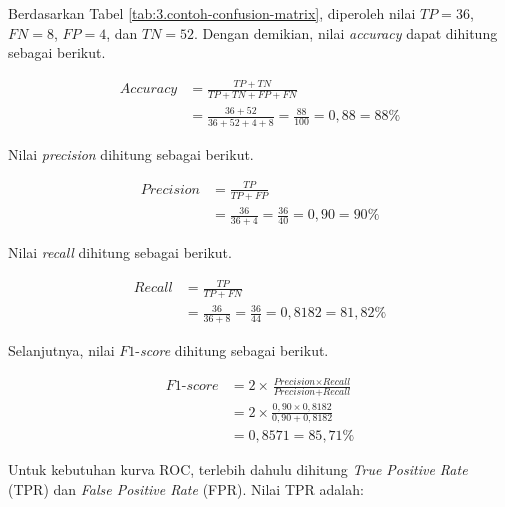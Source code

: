 Berdasarkan Tabel \ref{tab:3.contoh-confusion-matrix}, diperoleh nilai $TP = 36$, $FN = 8$, $FP = 4$, dan $TN = 52$. Dengan demikian, nilai \textit{accuracy} dapat dihitung sebagai berikut. \par

\begingroup
\setlength{\abovedisplayskip}{8pt}
\setlength{\belowdisplayskip}{10pt}
\setlength{\abovedisplayshortskip}{8pt}
\setlength{\belowdisplayshortskip}{10pt}
\setlength{\jot}{6pt}

\begin{align*}
\textit{Accuracy} &= \frac{TP + TN}{TP + TN + FP + FN} \\
&= \frac{36 + 52}{36 + 52 + 4 + 8} = \frac{88}{100} = 0{,}88 = 88\%
\end{align*}
\par

Nilai \textit{precision} dihitung sebagai berikut. \par

\begin{align*}
\textit{Precision} &= \frac{TP}{TP + FP} \\
&= \frac{36}{36 + 4} = \frac{36}{40} = 0{,}90 = 90\%
\end{align*}
\par

Nilai \textit{recall} dihitung sebagai berikut. \par

\begin{align*}
\textit{Recall} &= \frac{TP}{TP + FN} \\
&= \frac{36}{36 + 8} = \frac{36}{44} = 0{,}8182 = 81{,}82\%
\end{align*}
\par

Selanjutnya, nilai $F1$-\textit{score} dihitung sebagai berikut. \par

\begin{align*}
F1\textit{-score} &= 2 \times \frac{\textit{Precision} \times \textit{Recall}}{\textit{Precision} + \textit{Recall}} \\
&= 2 \times \frac{0{,}90 \times 0{,}8182}{0{,}90 + 0{,}8182} \\
&= 0{,}8571 = 85{,}71\%
\end{align*}
\par

Untuk kebutuhan kurva ROC, terlebih dahulu dihitung \textit{True Positive Rate} (TPR) dan \textit{False Positive Rate} (FPR). Nilai TPR adalah: \par

